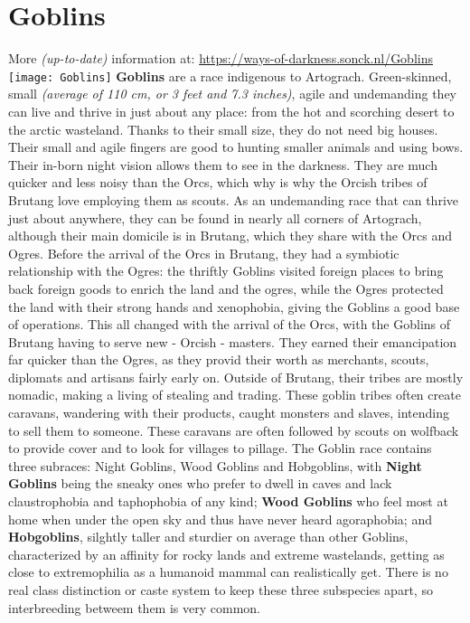 \documentclass[openany,10pt,a4paper]{book}
\begin{document}
\section{Goblins}
More \textit{(up-to-date)} information at: \url{https://ways-of-darkness.sonck.nl/Goblins}\newline
\texttt{[image: Goblins]}\newline
\textbf{Goblins} are a race indigenous to Artograch. Green-skinned, small \textit{(average of 110 cm, or 3 feet and 7.3 inches)}, agile and undemanding  they can live and thrive in just about any place: from the hot and scorching desert to the arctic wasteland. Thanks to their small size, they do not need big houses. Their small and agile fingers are good to hunting smaller animals and using bows. Their in-born night vision allows them to see in the darkness. They are much quicker and less noisy than the Orcs, which why is why the Orcish tribes of Brutang love employing them as scouts.\newline
As an undemanding race that can thrive just about anywhere, they can be found in nearly all corners of Artograch, although their main domicile is in Brutang, which they share with the Orcs and Ogres. Before the arrival of the Orcs in Brutang, they had a symbiotic relationship with the Ogres: the thriftly Goblins visited foreign places to bring back foreign goods to enrich the land and the ogres, while the Ogres protected the land with their strong hands and xenophobia, giving the Goblins a good base of operations. This all changed with the arrival of the Orcs, with the Goblins of Brutang having to serve new - Orcish - masters. They earned their emancipation far quicker than the Ogres, as they provid their worth as merchants, scouts, diplomats and artisans fairly early on. Outside of Brutang, their tribes are mostly nomadic, making a living of stealing and trading. These goblin tribes often create caravans, wandering with their products, caught monsters and slaves, intending to sell them to someone. These caravans are often followed by scouts on wolfback to provide cover and to look for villages to pillage.\newline
The Goblin race contains three subraces: Night Goblins, Wood Goblins and Hobgoblins, with \textbf{Night Goblins} being the sneaky ones who prefer to dwell in caves and lack claustrophobia and taphophobia of any kind; \textbf{Wood Goblins} who feel most at home when under the open sky and thus have never heard agoraphobia; and \textbf{Hobgoblins}, silghtly taller and sturdier on average than other Goblins, characterized by an affinity for rocky lands and extreme wastelands, getting as close to extremophilia as a humanoid mammal can realistically get. There is no real class distinction or caste system to keep these three subspecies apart, so interbreeding betweem them is very common.\newline
\end{document}
